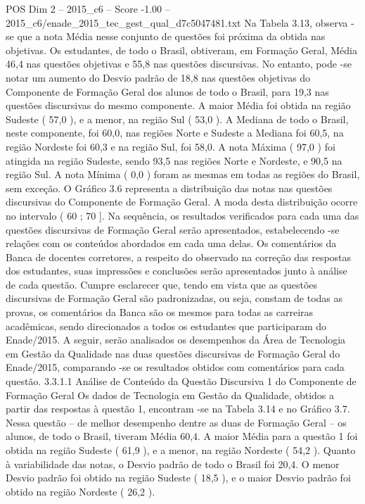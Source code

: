 \begin{textsample}{POS Dim 2 – 2015\_c6 – Score -1.00 – 2015\_c6/enade\_2015\_tec\_gest\_qual\_d7c5047481.txt}
Na Tabela 3.13, observa -se que a nota Média nesse conjunto de questões foi próxima da obtida nas objetivas.
Os estudantes, de todo o Brasil, obtiveram, em Formação Geral, Média 46,4 nas questões objetivas e 55,8 nas questões discursivas.
No entanto, pode -se notar um aumento do Desvio padrão de 18,8 nas questões objetivas do Componente de Formação Geral dos alunos de todo o Brasil, para 19,3 nas questões discursivas do mesmo componente.
A maior Média foi obtida na região Sudeste ( 57,0 ), e a menor, na região Sul ( 53,0 ).
A Mediana de todo o Brasil, neste componente, foi 60,0, nas regiões Norte e Sudeste a Mediana foi 60,5, na região Nordeste foi 60,3 e na região Sul, foi 58,0.
A nota Máxima ( 97,0 ) foi atingida na região Sudeste, sendo 93,5 nas regiões Norte e Nordeste, e 90,5 na região Sul.
A nota Mínima ( 0,0 ) foram as mesmas em todas as regiões do Brasil, sem exceção.
O Gráfico 3.6 representa a distribuição das notas nas questões discursivas do Componente de Formação Geral.
A moda desta distribuição ocorre no intervalo ( 60 ; 70 ].
Na sequência, os resultados verificados para cada uma das questões discursivas de Formação Geral serão apresentados, estabelecendo -se relações com os conteúdos abordados em cada uma delas.
Os comentários da Banca de docentes corretores, a respeito do observado na correção das respostas dos estudantes, suas impressões e conclusões serão apresentados junto à análise de cada questão.
Cumpre esclarecer que, tendo em vista que as questões discursivas de Formação Geral são padronizadas, ou seja, constam de todas as provas, os comentários da Banca são os mesmos para todas as carreiras acadêmicas, sendo direcionados a todos os estudantes que participaram do Enade/2015.
A seguir, serão analisados os desempenhos da Área de Tecnologia em Gestão da Qualidade nas duas questões discursivas de Formação Geral do Enade/2015, comparando -se os resultados obtidos com comentários para cada questão. 3.3.1.1 Análise de Conteúdo da Questão Discursiva 1 do Componente de Formação Geral Os dados de Tecnologia em Gestão da Qualidade, obtidos a partir das respostas à questão 1, encontram -se na Tabela 3.14 e no Gráfico 3.7.
Nessa questão – de melhor desempenho dentre as duas de Formação Geral – os alunos, de todo o Brasil, tiveram Média 60,4.
A maior Média para a questão 1 foi obtida na região Sudeste ( 61,9 ), e a menor, na região Nordeste ( 54,2 ).
Quanto à variabilidade das notas, o Desvio padrão de todo o Brasil foi 20,4.
O menor Desvio padrão foi obtido na região Sudeste ( 18,5 ), e o maior Desvio padrão foi obtido na região Nordeste ( 26,2 ).

\end{textsample}
